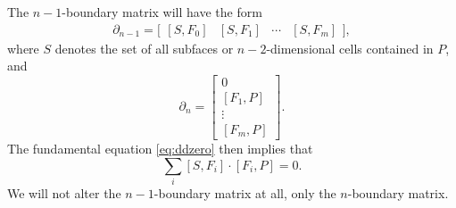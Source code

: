 \documentclass[twocolumn,leqno,twocolumn]{article}
\begin{document}
The $n - 1$-boundary matrix will have the form
\begin{equation}
    \partial_{n - 1} = \Big[\begin{matrix}[S, F_0] & [S, F_1] & \cdots & [S, F_m]\end{matrix}\Big],
\end{equation}
where $S$ denotes the set of all subfaces or $n - 2$-dimensional cells contained in $P$, and
\begin{equation}
    \partial_n = \left[\begin{matrix} 0 \\ [F_1, P] \\ \vdots \\ [F_m, P]\end{matrix}\right].
\end{equation}
The fundamental equation \eqref{eq:ddzero} then implies that
\begin{equation}
    \sum_i[S, F_i]\cdot[F_i, P] = 0.
    \label{eq:face-split-ddzero}
\end{equation}
We will not alter the $n - 1$-boundary matrix at all, only the $n$-boundary matrix.
\end{document}
